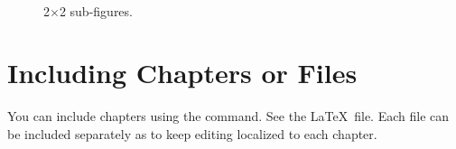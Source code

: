 \documentclass[12pt]{report}
\begin{document}
\begin{figure}[!t]
   \centering
    \quad
   \\
\caption{2$\times$2 sub-figures.}
\label{fig:2x2_subfigs}
\end{figure}

\section{Including Chapters or Files}
You can include chapters using the \verb'' command. See the \LaTeX\ file.  Each file can be included separately as to keep editing localized to each chapter.
%
%
\end{document}
